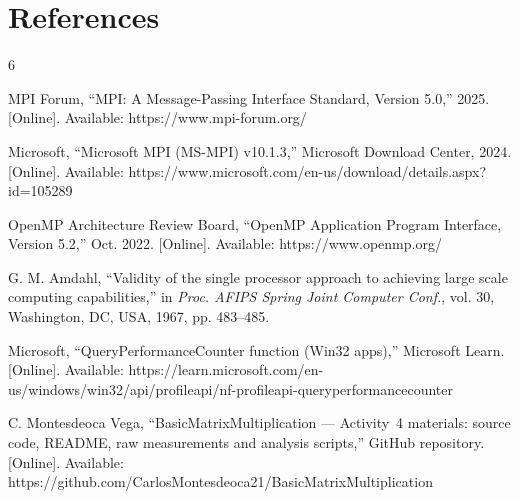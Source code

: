 \documentclass[12pt,a4paper]{article}
\begin{document}
\section{References}
\label{sec:refs}

\begin{thebibliography}{6}

 MPI Forum, ``MPI: A Message-Passing Interface Standard,
Version 5.0,'' 2025. [Online]. Available: https://www.mpi-forum.org/

 Microsoft, ``Microsoft MPI (MS-MPI) v10.1.3,'' Microsoft
Download Center, 2024. [Online]. Available:
https://www.microsoft.com/en-us/download/details.aspx?id=105289

 OpenMP Architecture Review Board, ``OpenMP Application
Program Interface, Version 5.2,'' Oct. 2022. [Online]. Available:
https://www.openmp.org/

 G. M. Amdahl, ``Validity of the single processor approach
to achieving large scale computing capabilities,'' in \emph{Proc. AFIPS
Spring Joint Computer Conf.}, vol. 30, Washington, DC, USA, 1967,
pp. 483--485.

 Microsoft, ``QueryPerformanceCounter function (Win32
apps),'' Microsoft Learn. [Online]. Available:
https://learn.microsoft.com/en-us/windows/win32/api/profileapi/nf-profileapi-queryperformancecounter

 C. Montesdeoca Vega, ``BasicMatrixMultiplication ---
Activity~4 materials: source code, README, raw measurements and analysis
scripts,'' GitHub repository. [Online]. Available:
https://github.com/CarlosMontesdeoca21/BasicMatrixMultiplication

\end{thebibliography}
\end{document}
